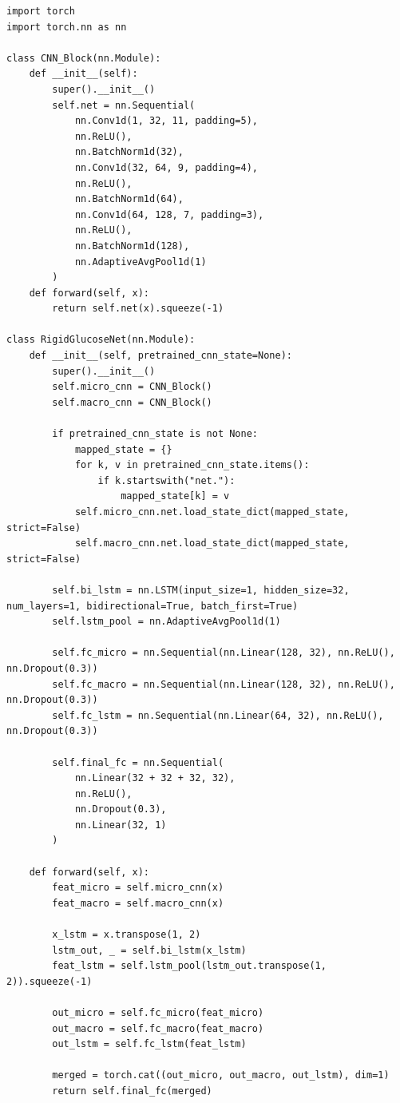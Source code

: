 \begin{verbatim}
import torch
import torch.nn as nn

class CNN_Block(nn.Module):
    def __init__(self):
        super().__init__()
        self.net = nn.Sequential(
            nn.Conv1d(1, 32, 11, padding=5),
            nn.ReLU(),
            nn.BatchNorm1d(32),
            nn.Conv1d(32, 64, 9, padding=4),
            nn.ReLU(),
            nn.BatchNorm1d(64),
            nn.Conv1d(64, 128, 7, padding=3),
            nn.ReLU(),
            nn.BatchNorm1d(128),
            nn.AdaptiveAvgPool1d(1)
        )
    def forward(self, x):
        return self.net(x).squeeze(-1)

class RigidGlucoseNet(nn.Module):
    def __init__(self, pretrained_cnn_state=None):
        super().__init__()
        self.micro_cnn = CNN_Block()
        self.macro_cnn = CNN_Block()
        
        if pretrained_cnn_state is not None:
            mapped_state = {}
            for k, v in pretrained_cnn_state.items():
                if k.startswith("net."):
                    mapped_state[k] = v
            self.micro_cnn.net.load_state_dict(mapped_state, strict=False)
            self.macro_cnn.net.load_state_dict(mapped_state, strict=False)

        self.bi_lstm = nn.LSTM(input_size=1, hidden_size=32, num_layers=1, bidirectional=True, batch_first=True)
        self.lstm_pool = nn.AdaptiveAvgPool1d(1)

        self.fc_micro = nn.Sequential(nn.Linear(128, 32), nn.ReLU(), nn.Dropout(0.3))
        self.fc_macro = nn.Sequential(nn.Linear(128, 32), nn.ReLU(), nn.Dropout(0.3))
        self.fc_lstm = nn.Sequential(nn.Linear(64, 32), nn.ReLU(), nn.Dropout(0.3))

        self.final_fc = nn.Sequential(
            nn.Linear(32 + 32 + 32, 32),
            nn.ReLU(),
            nn.Dropout(0.3),
            nn.Linear(32, 1) 
        )

    def forward(self, x):
        feat_micro = self.micro_cnn(x)
        feat_macro = self.macro_cnn(x)
        
        x_lstm = x.transpose(1, 2) 
        lstm_out, _ = self.bi_lstm(x_lstm)
        feat_lstm = self.lstm_pool(lstm_out.transpose(1, 2)).squeeze(-1)
        
        out_micro = self.fc_micro(feat_micro)
        out_macro = self.fc_macro(feat_macro)
        out_lstm = self.fc_lstm(feat_lstm)
        
        merged = torch.cat((out_micro, out_macro, out_lstm), dim=1)
        return self.final_fc(merged)
\end{verbatim}
\vspace{1.5em}

